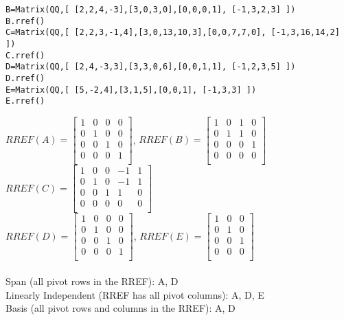 \documentclass{article}
\begin{document}
{\begin{verbatim}
B=Matrix(QQ,[ [2,2,4,-3],[3,0,3,0],[0,0,0,1], [-1,3,2,3] ])
B.rref()
C=Matrix(QQ,[ [2,2,3,-1,4],[3,0,13,10,3],[0,0,7,7,0], [-1,3,16,14,2] ])
C.rref()
D=Matrix(QQ,[ [2,4,-3,3],[3,3,0,6],[0,0,1,1], [-1,2,3,5] ])
D.rref()
E=Matrix(QQ,[ [5,-2,4],[3,1,5],[0,0,1], [-1,3,3] ])
E.rref()
\end{verbatim}

$
RREF(A) = \begin{bmatrix} 
1 & 0 & 0 & 0 \\ 
0 & 1 & 0 & 0 \\
0 & 0 & 1 & 0 \\
0 & 0 & 0 & 1 \\
\end{bmatrix}
$, $
RREF(B) = \begin{bmatrix} 
1 & 0 & 1 & 0 \\ 
0 & 1 & 1 & 0 \\
0 & 0 & 0 & 1 \\
0 & 0 & 0 & 0 \\
\end{bmatrix}
$ \\$
RREF(C) = \begin{bmatrix} 
1 & 0 & 0 & -1 & 1 \\ 
0 & 1 & 0 & -1 & 1 \\ 
0 & 0 & 1 & 1 & 0 \\ 
0 & 0 & 0 & 0 & 0 \\ 
\end{bmatrix}
$\\$RREF(D) = \begin{bmatrix} 
1 & 0 & 0 & 0 \\ 
0 & 1 & 0 & 0 \\
0 & 0 & 1 & 0 \\
0 & 0 & 0 & 1 \\
\end{bmatrix}
$, $RREF(E) = \begin{bmatrix} 
1 & 0 & 0\\ 
0 & 1 & 0\\
0 & 0 & 1\\
0 & 0 & 0\\
\end{bmatrix}
$\\
\\
Span (all pivot rows in the RREF): A, D\\
Linearly Independent (RREF has all pivot columns): A, D, E\\
Basis (all pivot rows and columns in the RREF): A, D\\
}
\end{document}
